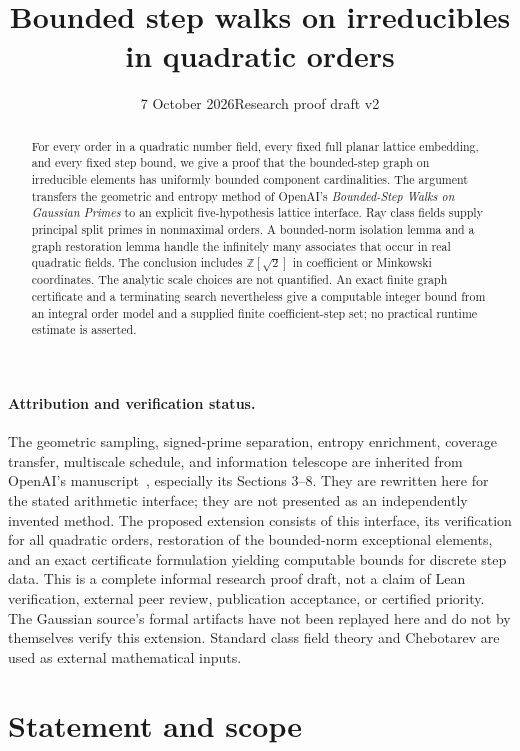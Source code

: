 \documentclass[11pt]{article}
\title{Bounded step walks on irreducibles in quadratic orders}
\author{}
\date{7 October 2026\quad\textnormal{Research proof draft v2}}
\numberwithin{equation}{section}
\theoremstyle{definition}\newtheorem{definition}[theorem]{Definition}
\theoremstyle{remark}\newtheorem{remark}[theorem]{Remark}
\newcommand{\Z}{\mathbb Z}\newcommand{\Q}{\mathbb Q}\newcommand{\R}{\mathbb R}
\begin{document}
\maketitle
\begin{abstract}
For every order in a quadratic number field, every fixed full planar lattice embedding, and every fixed step bound, we give a proof that the bounded-step graph on irreducible elements has uniformly bounded component cardinalities. The argument transfers the geometric and entropy method of OpenAI's \emph{Bounded-Step Walks on Gaussian Primes} to an explicit five-hypothesis lattice interface. Ray class fields supply principal split primes in nonmaximal orders. A bounded-norm isolation lemma and a graph restoration lemma handle the infinitely many associates that occur in real quadratic fields. The conclusion includes $\Z[\sqrt2]$ in coefficient or Minkowski coordinates. The analytic scale choices are not quantified. An exact finite graph certificate and a terminating search nevertheless give a computable integer bound from an integral order model and a supplied finite coefficient-step set; no practical runtime estimate is asserted.
\end{abstract}

\paragraph{Attribution and verification status.}
The geometric sampling, signed-prime separation, entropy enrichment, coverage transfer, multiscale schedule, and information telescope are inherited from OpenAI's manuscript~\cite{openai}, especially its Sections 3--8. They are rewritten here for the stated arithmetic interface; they are not presented as an independently invented method. The proposed extension consists of this interface, its verification for all quadratic orders, restoration of the bounded-norm exceptional elements, and an exact certificate formulation yielding computable bounds for discrete step data. This is a complete informal research proof draft, not a claim of Lean verification, external peer review, publication acceptance, or certified priority. The Gaussian source's formal artifacts have not been replayed here and do not by themselves verify this extension. Standard class field theory and Chebotarev are used as external mathematical inputs.

\section{Statement and scope}
\end{document}
